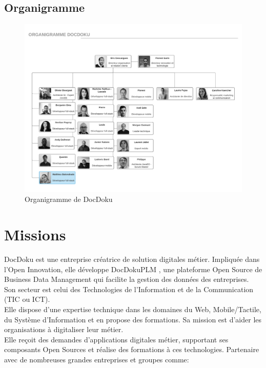 \documentclass[11pt]{report}
\begin{document}
		\section{Organigramme}

			\begin{landscape}
				\begin{figure}[!htb]
				\center
				\includegraphics[scale=0.75]{Organigramme.pdf}
				\caption{Organigramme de DocDoku}
				\end{figure}
			\end{landscape}

	\chapter{Missions}

		DocDoku est une entreprise créatrice de solution digitales métier. Impliquée dans l'Open Innovation, elle développe DocDokuPLM , une plateforme Open Source de Business Data Management qui facilite la gestion des données des entreprises.\\
		Son secteur est celui des Technologies de l'Information et de la Communication (TIC ou ICT).\\
		Elle dispose d'une expertise technique dans les domaines du Web, Mobile/Tactile, du Système d'Information et en propose des formations. 
		Sa mission est d'aider les organisations à digitaliser leur métier.\\
		Elle reçoit des demandes d'applications digitales métier, supportant ses composants Open Sources et réalise des formations à ces technologies.
		Partenaire avec de nombreuses grandes entreprises et groupes comme:
\end{document}
